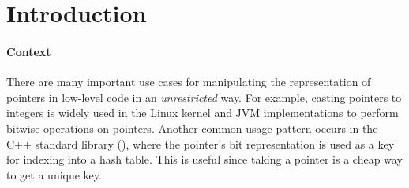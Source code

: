 \section{Introduction}
%

\paragraph{Context}

There are many important use cases for manipulating the representation of pointers in low-level code
in an \emph{unrestricted} way.  For example, casting pointers to integers is widely used in the
Linux kernel and JVM implementations to perform bitwise operations on pointers.  Another common
usage pattern occurs in the C++ standard library (), where the pointer's bit
representation is used as a key for indexing into a hash table.  This is useful since taking a
pointer is a cheap way to get a unique key.


%


